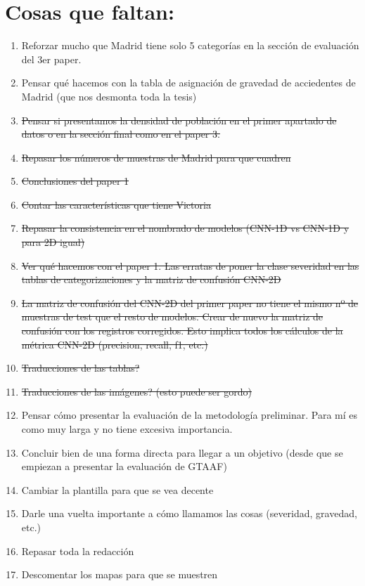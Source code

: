\documentclass{uathesis-es}
\begin{document}
{		\section{Cosas que faltan:}
		\begin{enumerate}
			\item Reforzar mucho que Madrid tiene solo 5 categorías en la sección de evaluación del 3er paper.
			\item Pensar qué hacemos con la tabla de asignación de gravedad de acciedentes de Madrid (que nos desmonta toda la tesis)
			\item \sout{Pensar si presentamos la densidad de población en el primer apartado de datos o en la sección final como en el paper 3.}
			\item \sout{Repasar los números de muestras de Madrid para que cuadren}
			\item \sout{Conclusiones del paper 1}
			\item \sout{Contar las características que tiene Victoria}
			\item \sout{Repasar la consistencia en el nombrado de modelos (CNN-1D vs CNN-1D y para 2D igual)}
			\item \sout{Ver qué hacemos con el paper 1. Las erratas de poner la clase severidad en las tablas de categorizaciones y la matriz de confusión CNN-2D}
			\item \sout{La matriz de confusión del CNN-2D del primer paper no tiene el mismo nº de muestras de test que el resto de modelos. Crear de nuevo la matriz de confusión con los registros corregidos. Esto implica todos los cálculos de la métrica CNN-2D (precision, recall, f1, etc.)}
			\item \sout{Traducciones de las tablas?}
			\item \sout{Traducciones de las imágenes? (esto puede ser gordo)}
			\item Pensar cómo presentar la evaluación de la metodología preliminar. Para mí es como muy larga y no tiene excesiva importancia.
			\item Concluir bien de una forma directa para llegar a un objetivo (desde que se empiezan a presentar la evaluación de GTAAF)
			\item Cambiar la plantilla para que se vea decente
			\item Darle una vuelta importante a cómo llamamos las cosas (severidad, gravedad, etc.)
			\item Repasar toda la redacción
			\item Descomentar los mapas para que se muestren
		\end{enumerate}
		
}
\end{document}
